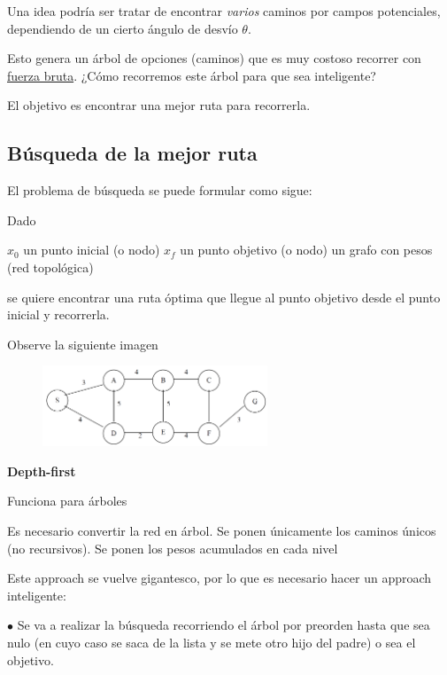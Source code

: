 Una idea podría ser tratar de encontrar \textit{varios} caminos por campos potenciales, dependiendo de un cierto
ángulo de desvío $\theta$.

Esto genera un árbol de opciones (caminos) que es muy costoso recorrer con \underline{fuerza bruta}. ¿Cómo recorremos
este árbol para que sea inteligente?

El objetivo es encontrar una mejor ruta para recorrerla. 

\subsection{Búsqueda de la mejor ruta}

El problema de búsqueda se puede formular como sigue:
 
\begin{scaja}
	Dado
	
	$x_0$ un punto inicial (o nodo)
	$x_f$ un punto objetivo (o nodo)
	un grafo con pesos (red topológica)
	
	se quiere encontrar una ruta óptima que llegue al punto objetivo desde el punto inicial y recorrerla.

\end{scaja} 

\begin{ejemplo}
	
Observe la siguiente imagen 

\end{ejemplo}

\begin{figure}[h!]
	\centering
	\includegraphics[width=0.6\textwidth]{images/img98.png}
	\label{figura98}
\end{figure}

\textbf{Depth-first}

Funciona para árboles

Es necesario convertir la red en árbol. Se ponen únicamente los caminos únicos (no recursivos).
Se ponen los pesos acumulados en cada nivel

Este approach se vuelve gigantesco, por lo que es necesario hacer un approach inteligente:

$\bullet$	Se va a realizar la búsqueda recorriendo el árbol por preorden hasta que sea nulo (en cuyo caso se
saca de la lista y se mete otro hijo del padre) o sea el objetivo.

